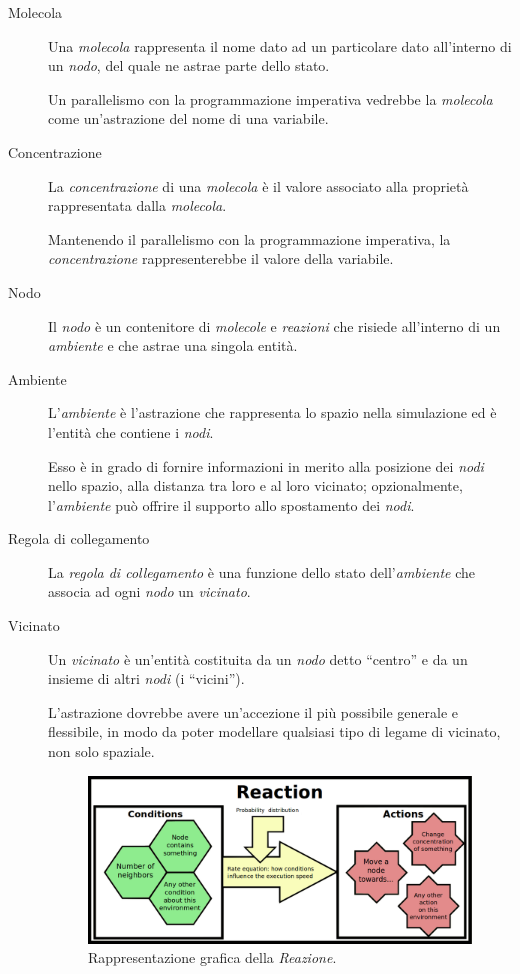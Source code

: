     \begin{description}
      \item[Molecola]\label{itm:mol}
        Una \emph{molecola} rappresenta il nome dato ad un particolare dato all'interno di un \emph{nodo}, del quale ne astrae parte dello stato.

        Un parallelismo con la programmazione imperativa vedrebbe la \emph{molecola} come un'astrazione del nome di una variabile.

      \item[Concentrazione]\label{itm:conc}
        La \emph{concentrazione} di una \emph{molecola} è il valore associato alla proprietà rappresentata dalla \emph{molecola}.

        Mantenendo il parallelismo con la programmazione imperativa, la \emph{concentrazione} rappresenterebbe il valore della variabile.

      \item[Nodo]\label{itm:node}
        Il \emph{nodo} è un contenitore di \emph{molecole} e \emph{reazioni} che risiede all'interno di un \emph{ambiente} e che astrae una singola entità.

      \item[Ambiente]\label{itm:env}
        L'\emph{ambiente} è l'astrazione che rappresenta lo spazio nella simulazione ed è l'entità che contiene i \emph{nodi}.

        Esso è in grado di fornire informazioni in merito alla posizione dei \emph{nodi} nello spazio, alla distanza tra loro e al loro vicinato;
        opzionalmente, l'\emph{ambiente} può offrire il supporto allo spostamento dei \emph{nodi}.

      \item[Regola di collegamento]\label{itm:linkr}
        La \emph{regola di collegamento} è una funzione dello stato dell'\emph{ambiente} che associa ad ogni \emph{nodo} un \emph{vicinato}.

      \item[Vicinato]\label{itm:neigh}
        Un \emph{vicinato} è un'entità costituita da un \emph{nodo} detto ``centro'' e da un insieme di altri \emph{nodi} (i ``vicini'').

        L'astrazione dovrebbe avere un'accezione il più possibile generale e flessibile, in modo da poter modellare qualsiasi tipo di legame di vicinato, non solo spaziale.

        \begin{figure}[htbp]
          \centering
          \includegraphics[width=.85\textwidth]{res/fig/alchemist_reaction.png}
          \caption{Rappresentazione grafica della \emph{Reazione}.}%
          \label{fig:alchemist:reaction}
        \end{figure}


\end{description}
